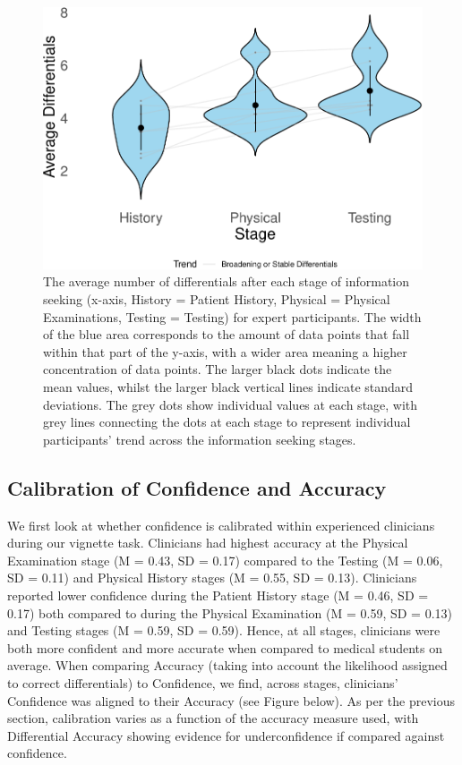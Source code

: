 \documentclass[a4paper, nobind]{templates/ociamthesis}
\begin{document}
\begin{figure}[H]
\includegraphics{_main_files/figure-latex/expdiffs-1} \caption[Online Study Appendix: Average Differentials by Stage for Expert Participants (Violin Plot)]{The average number of differentials after each stage of information seeking (x-axis, History = Patient History, Physical = Physical Examinations, Testing = Testing) for expert participants. The width of the blue area corresponds to the amount of data points that fall within that part of the y-axis, with a wider area meaning a higher concentration of data points. The larger black dots indicate the mean values, whilst the larger black vertical lines indicate standard deviations. The grey dots show individual values at each stage, with grey lines connecting the dots at each stage to represent individual participants' trend across the information seeking stages.}\label{fig:expdiffs}
\end{figure}

\newpage

\subsection{Calibration of Confidence and Accuracy}\label{calibration-of-confidence-and-accuracy}

We first look at whether confidence is calibrated within experienced clinicians during our vignette task. Clinicians had highest accuracy at the Physical Examination stage (M = 0.43, SD = 0.17) compared to the Testing (M = 0.06, SD = 0.11) and Physical History stages (M = 0.55, SD = 0.13). Clinicians reported lower confidence during the Patient History stage (M = 0.46, SD = 0.17) both compared to during the Physical Examination (M = 0.59, SD = 0.13) and Testing stages (M = 0.59, SD = 0.59). Hence, at all stages, clinicians were both more confident and more accurate when compared to medical students on average. When comparing Accuracy (taking into account the likelihood assigned to correct differentials) to Confidence, we find, across stages, clinicians' Confidence was aligned to their Accuracy (see Figure below). As per the previous section, calibration varies as a function of the accuracy measure used, with Differential Accuracy showing evidence for underconfidence if compared against confidence.
\end{document}
